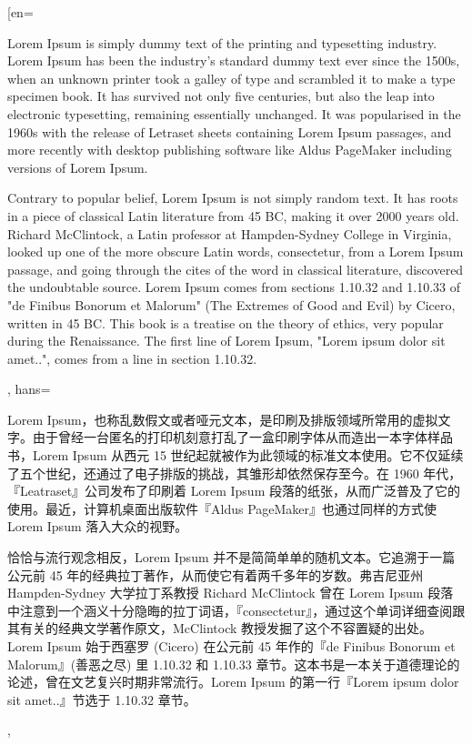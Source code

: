 \translate[en={Lorem Ipsum is simply dummy text of the printing and typesetting industry. Lorem Ipsum has been the industry's standard dummy text ever since the 1500s, when an unknown printer took a galley of type and scrambled it to make a type specimen book. It has survived not only five centuries, but also the leap into electronic typesetting, remaining essentially unchanged. It was popularised in the 1960s with the release of Letraset sheets containing Lorem Ipsum passages, and more recently with desktop publishing software like Aldus PageMaker including versions of Lorem Ipsum.\par Contrary to popular belief, Lorem Ipsum is not simply random text. It has roots in a piece of classical Latin literature from 45 BC, making it over 2000 years old. Richard McClintock, a Latin professor at Hampden-Sydney College in Virginia, looked up one of the more obscure Latin words, consectetur, from a Lorem Ipsum passage, and going through the cites of the word in classical literature, discovered the undoubtable source. Lorem Ipsum comes from sections 1.10.32 and 1.10.33 of "de Finibus Bonorum et Malorum" (The Extremes of Good and Evil) by Cicero, written in 45 BC. This book is a treatise on the theory of ethics, very popular during the Renaissance. The first line of Lorem Ipsum, "Lorem ipsum dolor sit amet..", comes from a line in section 1.10.32.},%
hans={Lorem Ipsum，也称乱数假文或者哑元文本，是印刷及排版领域所常用的虚拟文字。由于曾经一台匿名的打印机刻意打乱了一盒印刷字体从而造出一本字体样品书，Lorem Ipsum 从西元 15 世纪起就被作为此领域的标准文本使用。它不仅延续了五个世纪，还通过了电子排版的挑战，其雏形却依然保存至今。在 1960 年代，『Leatraset』公司发布了印刷着 Lorem Ipsum 段落的纸张，从而广泛普及了它的使用。最近，计算机桌面出版软件『Aldus PageMaker』也通过同样的方式使 Lorem Ipsum 落入大众的视野。\par 恰恰与流行观念相反，Lorem Ipsum 并不是简简单单的随机文本。它追溯于一篇公元前 45 年的经典拉丁著作，从而使它有着两千多年的岁数。弗吉尼亚州 Hampden-Sydney 大学拉丁系教授 Richard McClintock 曾在 Lorem Ipsum 段落中注意到一个涵义十分隐晦的拉丁词语，『consectetur』，通过这个单词详细查阅跟其有关的经典文学著作原文，McClintock 教授发掘了这个不容置疑的出处。Lorem Ipsum 始于西塞罗 (Cicero) 在公元前 45 年作的『de Finibus Bonorum et Malorum』(善恶之尽) 里 1.10.32 和 1.10.33 章节。这本书是一本关于道德理论的论述，曾在文艺复兴时期非常流行。Lorem Ipsum 的第一行『Lorem ipsum dolor sit amet..』节选于 1.10.32 章节。},%
